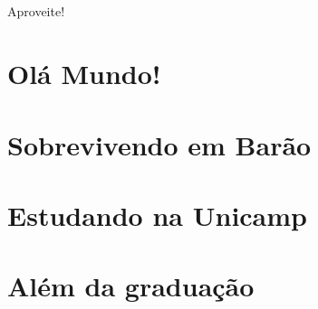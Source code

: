 \documentclass[a4paper,10pt,oldfontcommands]{memoir}
\begin{document}
\paragraph{}
Aproveite!


\mainmatter
\pagestyle{headings}
\twocolumn
\chapter{Olá Mundo!}


\clearpage


\clearpage


\clearpage



\chapter{Sobrevivendo em Barão}

\newpage

\newpage

\newpage

\newpage


\chapter{Estudando na Unicamp}

\newpage

\newpage

\newpage

\newpage

\newpage

\newpage

\newpage

\newpage

\newpage


\chapter{Além da graduação}

\newpage

\newpage

\newpage

\newpage

\newpage

\newpage

\end{document}
